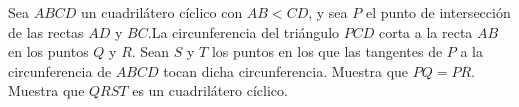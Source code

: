 Sea $ABCD$ un cuadrilátero cíclico con $AB \lt CD$, y sea $P$ el punto de intersección de las rectas $AD$ y $BC$.La circunferencia del triángulo $PCD$ corta a la recta $AB$ en los puntos $Q$ y $R.$ Sean $S$ y $T$ los puntos en los que las tangentes de $P$ a la circunferencia de $ABCD$ tocan dicha circunferencia. Muestra que $PQ=PR$. Muestra que $QRST$ es un cuadrilátero cíclico.

